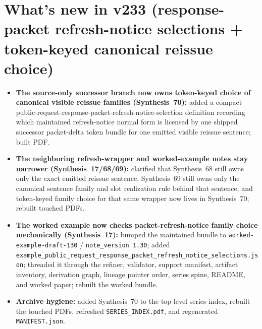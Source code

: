 \documentclass[11pt]{article}
\begin{document}
\section{What's new in v233 (response-packet refresh-notice selections + token-keyed canonical reissue choice)}
\begin{itemize}[leftmargin=*]
\item \textbf{The source-only successor branch now owns token-keyed choice of canonical visible reissue families (Synthesis~70):} added a compact public-request-response-packet-refresh-notice-selection definition recording which maintained refresh-notice normal form is licensed by one shipped successor packet-delta token bundle for one emitted visible reissue sentence; built PDF.
\item \textbf{The neighboring refresh-wrapper and worked-example notes stay narrower (Synthesis~17/68/69):} clarified that Synthesis~68 still owns only the exact emitted reissue sentence, Synthesis~69 still owns only the canonical sentence family and slot realization rule behind that sentence, and token-keyed family choice for that same wrapper now lives in Synthesis~70; rebuilt touched PDFs.
\item \textbf{The worked example now checks packet-refresh-notice family choice mechanically (Synthesis~17):} bumped the maintained bundle to \texttt{worked-example-draft-130} / \texttt{note\_version 1.30}; added \texttt{example\_public\_request\_response\_packet\_refresh\_notice\_selections.json}; threaded it through the refiner, validator, support manifest, artifact inventory, derivation graph, lineage pointer order, series spine, README, and worked paper; rebuilt the worked bundle.
\item \textbf{Archive hygiene:} added Synthesis~70 to the top-level series index, rebuilt the touched PDFs, refreshed \texttt{SERIES\_INDEX.pdf}, and regenerated \texttt{MANIFEST.json}.
\end{itemize}
\end{document}
